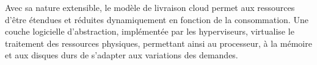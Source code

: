 Avec sa nature extensible, le modèle de livraison cloud permet aux ressources d'être étendues et réduites  dynamiquement en fonction de la consommation. Une couche logicielle d'abstraction, implémentée par les hyperviseurs, virtualise le traitement des ressources physiques,  permettant ainsi au processeur, à la mémoire et aux disques durs de s'adapter aux variations des demandes. \cite{journeySDDC} \cite{awsScaling}






